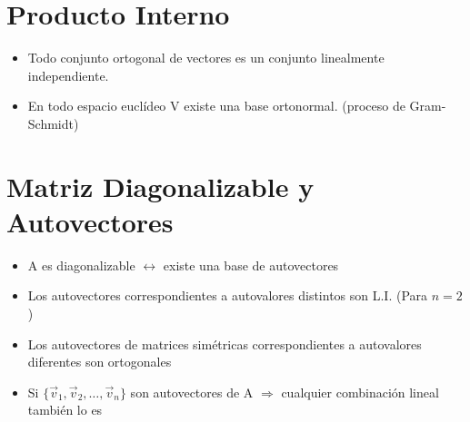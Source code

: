 \documentclass[11pt]{article}
\begin{document}
\section{Producto Interno}
\begin{itemize}
\item Todo conjunto ortogonal de vectores es un conjunto linealmente independiente.
\item  En todo espacio euclídeo V existe una base ortonormal. (proceso de Gram-Schmidt)
\end{itemize}

\section{Matriz Diagonalizable y Autovectores}
\begin{itemize}
\item A es diagonalizable $\leftrightarrow$ existe una base de autovectores 
\item Los autovectores correspondientes a autovalores distintos son L.I. (Para $n = 2$)
\item Los autovectores de matrices simétricas correspondientes a autovalores diferentes son ortogonales
\item  Si $\{ \vec{v}_1,\vec{v}_2,\hdots, \vec{v}_n\}$ son autovectores de A $\Rightarrow$ cualquier combinación lineal también lo es 
\end{itemize}
\end{document}
